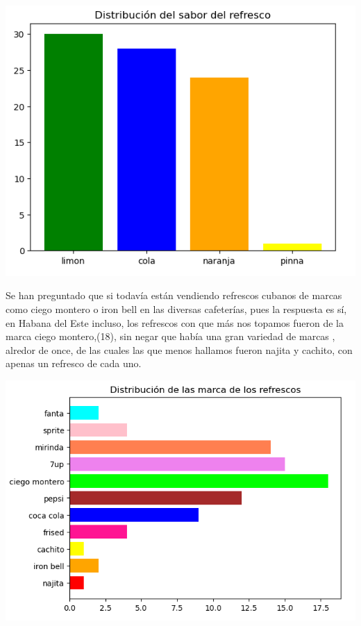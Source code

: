 \documentclass[a4paper,11pt]{article}
\begin{document}
\begin{minipage}{0.5\textwidth}
  \begin{center}
    \includegraphics[width=1.4\textwidth]{sabor de refresco.png}
  \end{center}
\end{minipage}
\par\vspace{2pt}
Se han preguntado que si todavía están vendiendo refrescos cubanos de marcas como ciego montero o iron bell en las diversas cafeterías, pues la respuesta es sí, en Habana del Este incluso, los refrescos con que más nos topamos fueron de la marca ciego montero,(18), sin negar que había una gran variedad de marcas , alredor de once,  de las cuales las que menos hallamos fueron najita y cachito, con apenas un refresco de cada uno.
\par\vspace{2pt}
\begin{minipage}{0.5\textwidth}
  \begin{center}
    \includegraphics[width=1.4\textwidth]{marca de refresco.png}
  \end{center}
\end{minipage}
\end{document}
